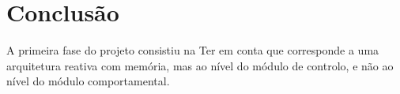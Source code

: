 \chapter{Conclusão}\label{ch:conclusao}

A primeira fase do projeto consistiu na
Ter em conta que corresponde a uma arquitetura reativa com memória, mas ao nível do módulo de controlo, e não ao nível do módulo comportamental.
